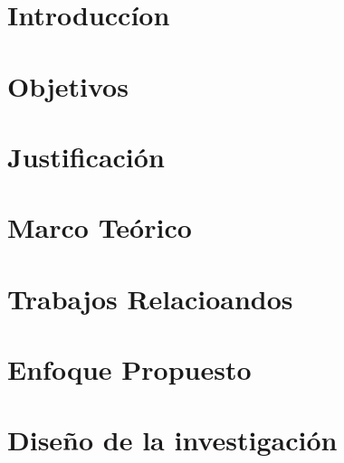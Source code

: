 \documentclass[journal]{IEEEtran}
\begin{document}



\maketitle





\section{Introduccíon}


\section{Objetivos}


\section{Justificación}


\section{Marco Teórico}


\section{Trabajos Relacioandos}


\section{Enfoque Propuesto}


\section{Diseño de la investigación}

\end{document}
